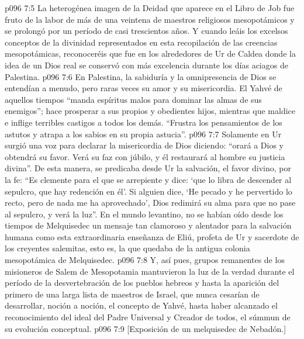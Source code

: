 \vs p096 7:5 \pc La heterogénea imagen de la Deidad que aparece en el Libro de Job fue fruto de la labor de más de una veintena de maestros religiosos mesopotámicos y se prolongó por un período de casi trescientos años. Y cuando leáis los excelsos conceptos de la divinidad representados en esta recopilación de las creencias mesopotámicas, reconoceréis que fue en los alrededores de Ur de Caldea donde la idea de un Dios real se conservó con más excelencia durante los días aciagos de Palestina.
\vs p096 7:6 En Palestina, la sabiduría y la omnipresencia de Dios se entendían a menudo, pero raras veces su amor y su misericordia. El Yahvé de aquellos tiempos “manda espíritus malos para dominar las almas de sus enemigos”; hace prosperar a sus propios y obedientes hijos, mientras que maldice e inflige terribles castigos a todos los demás. “Frustra los pensamientos de los astutos y atrapa a los sabios en su propia astucia”.
\vs p096 7:7 Solamente en Ur surgió una voz para declarar la misericordia de Dios diciendo: “orará a Dios y obtendrá su favor. Verá su faz con júbilo, y él restaurará al hombre su justicia divina”. De esta manera, se predicaba desde Ur la salvación, el favor divino, por la fe: “Es clemente para el que se arrepiente y dice: ‘que lo libra de descender al sepulcro, que hay redención en él'. Si alguien dice, ‘He pecado y he pervertido lo recto, pero de nada me ha aprovechado’, Dios redimirá su alma para que no pase al sepulcro, y verá la luz”. En el mundo levantino, no se habían oído desde los tiempos de Melquisedec un mensaje tan clamoroso y alentador para la salvación humana como esta extraordinaria enseñanza de Eliú, profeta de Ur y sacerdote de los creyentes salemitas, esto es, la que quedaba de la antigua colonia mesopotámica de Melquisedec.
\vs p096 7:8 Y, así pues, grupos remanentes de los misioneros de Salem de Mesopotamia mantuvieron la luz de la verdad durante el período de la desvertebración de los pueblos hebreos y hasta la aparición del primero de una larga lista de maestros de Israel, que nunca cesarían de desarrollar, noción a noción, el concepto de Yahvé, hasta haber alcanzado el reconocimiento del ideal del Padre Universal y Creador de todos, el súmmun de su evolución conceptual.
\vsetoff
\vs p096 7:9 [Exposición de un melquisedec de Nebadón.]
